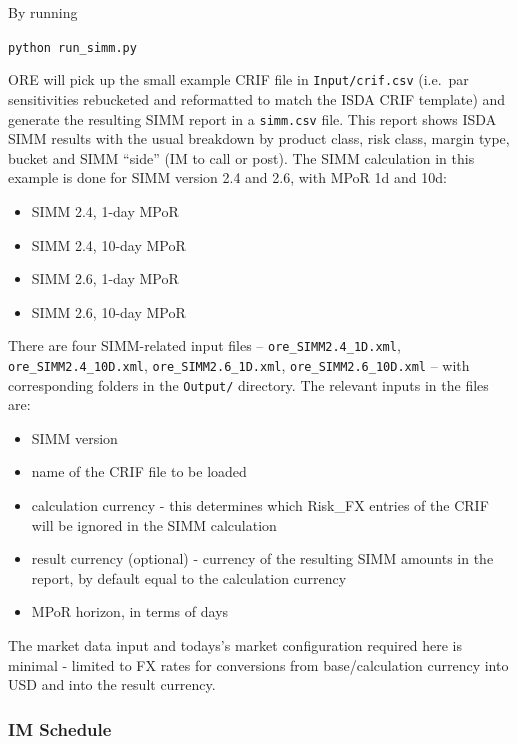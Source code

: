 By running \\
\medskip
\centerline{{\tt python run\_simm.py}} 

\medskip
ORE will pick up the small example CRIF file in {\tt Input/crif.csv} (i.e.\ par sensitivities rebucketed and reformatted to match the ISDA CRIF template) and generate the resulting SIMM report in a {\tt simm.csv} file.
This report shows ISDA SIMM results with the usual breakdown by product class, risk class, margin type, bucket and SIMM ``side'' (IM to call or post).
The SIMM calculation in this example is done for SIMM version 2.4 and 2.6, with MPoR 1d and 10d:

\begin{itemize}
  \item SIMM 2.4, 1-day MPoR
  \item SIMM 2.4, 10-day MPoR
  \item SIMM 2.6, 1-day MPoR
  \item SIMM 2.6, 10-day MPoR
\end{itemize}

\medskip
There are four SIMM-related input files -- {\tt ore\_SIMM2.4\_1D.xml}, {\tt ore\_SIMM2.4\_10D.xml}, {\tt ore\_SIMM2.6\_1D.xml}, {\tt ore\_SIMM2.6\_10D.xml} -- with corresponding folders in the {\tt Output/} directory.
The relevant inputs in the files are:

\begin{itemize}
\item SIMM version
\item name of the CRIF file to be loaded
\item calculation currency - this determines which Risk\_FX entries of the CRIF will be ignored in the SIMM calculation
\item result currency (optional) - currency of the resulting SIMM amounts in the report, by default equal to the calculation currency
\item MPoR horizon, in terms of days
\end{itemize}

The market data input and todays's market configuration required here is minimal - limited to FX rates for conversions from base/calculation currency into USD and into the result currency.



\subsubsection*{IM Schedule}

